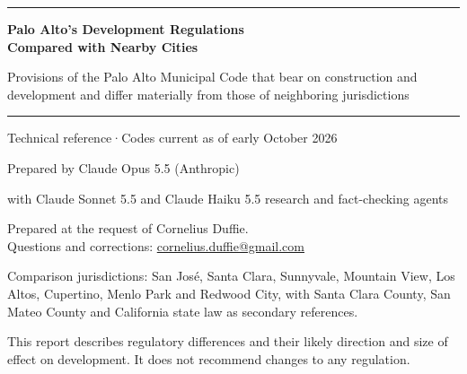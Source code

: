 \documentclass[11pt]{article}
\begin{document}
\begin{titlepage}
\sffamily
\vspace*{1.2in}
{\color{accent}\rule{\linewidth}{1.2pt}}\par\vspace{14pt}
{\Huge\bfseries\color{ink} Palo Alto's Development Regulations\\[4pt] Compared with Nearby Cities\par}
\vspace{12pt}
{\Large\color{ink} Provisions of the Palo Alto Municipal Code that bear on construction and development and differ materially from those of neighboring jurisdictions\par}
\vspace{14pt}
{\color{accent}\rule{\linewidth}{1.2pt}}\par
\vspace{24pt}
{\large Technical reference\quad·\quad Codes current as of early October 2026\par}
\vspace{10pt}
{\large Prepared by Claude Opus 5.5 (Anthropic)\par}
{\normalsize\color{dirUcol} with Claude Sonnet 5.5 and Claude Haiku 5.5 research and fact-checking agents\par}
\vspace{14pt}
{\small\color{dirUcol} Prepared at the request of Cornelius Duffie.\\ Questions and corrections: \href{mailto:cornelius.duffie@gmail.com}{cornelius.duffie@gmail.com}\par}
\vfill
{\small\color{dirUcol}
Comparison jurisdictions: San José, Santa Clara, Sunnyvale, Mountain View, Los Altos, Cupertino, Menlo Park and Redwood City, with Santa Clara County, San Mateo County and California state law as secondary references.\par\medskip
This report describes regulatory differences and their likely direction and size of effect on development. It does not recommend changes to any regulation.\par}
\end{titlepage}

\tableofcontents
\clearpage
{}





\clearpage
\appendix
\renewcommand{\thesection}{\Alph{section}}

\end{document}
